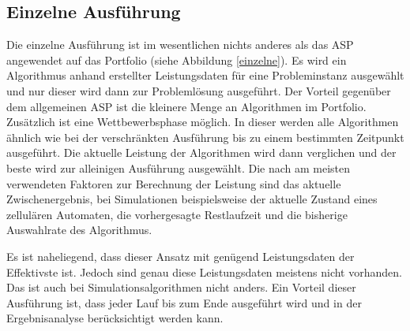 \subsection{Einzelne Ausführung}

Die einzelne Ausführung ist im wesentlichen nichts anderes als das ASP angewendet auf das Portfolio (siehe Abbildung \ref{einzelne}). Es wird ein Algorithmus anhand erstellter Leistungsdaten für eine Probleminstanz ausgewählt und nur dieser wird dann zur Problemlösung ausgeführt. Der Vorteil gegenüber dem allgemeinen ASP ist die kleinere Menge an Algorithmen im Portfolio. Zusätzlich ist eine Wettbewerbsphase möglich. In dieser werden alle Algorithmen ähnlich wie bei der verschränkten Ausführung bis zu einem bestimmten Zeitpunkt ausgeführt. Die aktuelle Leistung der Algorithmen wird dann verglichen und der beste wird zur alleinigen Ausführung ausgewählt. Die nach \cite{roberts06} am meisten verwendeten Faktoren zur Berechnung der Leistung sind das aktuelle Zwischenergebnis, bei Simulationen beispielsweise der aktuelle Zustand eines zellulären Automaten, die vorhergesagte Restlaufzeit und die bisherige Auswahlrate des Algorithmus.

Es ist naheliegend, dass dieser Ansatz mit genügend Leistungsdaten der Effektivste ist. Jedoch sind genau diese Leistungsdaten meistens nicht vorhanden. Das ist auch bei Simulationsalgorithmen nicht anders. Ein Vorteil dieser Ausführung ist, dass jeder Lauf bis zum Ende ausgeführt wird und in der Ergebnisanalyse berücksichtigt werden kann. \\



